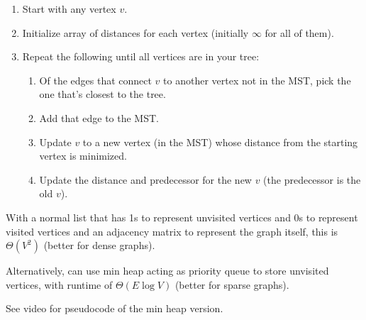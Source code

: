 \begin{enumerate}
    \item Start with any vertex $v$.
    \item Initialize array of distances for each vertex (initially $\infty$ for all of them).
    \item Repeat the following until all vertices are in your tree:
        \begin{enumerate}
            \item Of the edges that connect $v$ to another vertex not in the MST, pick the one that's closest to the tree.
            \item Add that edge to the MST.
            \item Update $v$ to a new vertex (in the MST) whose distance from the starting vertex is minimized.
            \item Update the distance and predecessor for the new $v$ (the predecessor is the old $v$).
        \end{enumerate}
\end{enumerate}

With a normal list that has 1s to represent unvisited vertices and 0s to represent visited vertices and an adjacency matrix to represent the graph itself, this is $\Theta(V^2)$ (better for dense graphs).

Alternatively, can use min heap acting as priority queue to store unvisited vertices, with runtime of $\Theta(E \log V)$ (better for sparse graphs).

See video for pseudocode of the min heap version.
